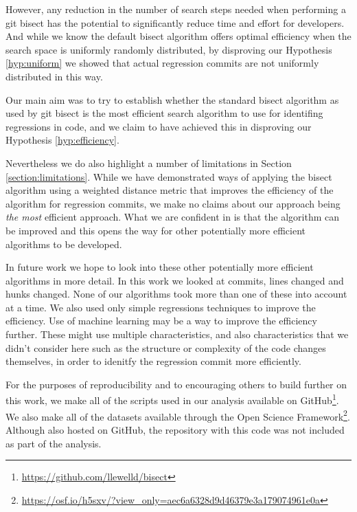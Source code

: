 \documentclass[10pt,journal,compsoc]{IEEEtran}
\begin{document}
However, any reduction in the number of search steps needed when performing a {\code git bisect} has the potential to significantly reduce time and effort for developers. And while we know the default bisect algorithm offers optimal efficiency when the search space is uniformly randomly distributed, by disproving our Hypothesis \ref{hyp:uniform} we showed that actual regression commits are not uniformly distributed in this way.

Our main aim was to try to establish whether the standard bisect algorithm as used by {\code git bisect} is the most efficient search algorithm to use for identifing regressions in code, and we claim to have achieved this in disproving our Hypothesis \ref{hyp:efficiency}.

Nevertheless we do also highlight a number of limitations in Section \ref{section:limitations}. While we have demonstrated ways of applying the bisect algorithm using a weighted distance metric that improves the efficiency of the algorithm for regression commits, we make no claims about our approach being {\it the most\/} efficient approach. What we are confident in is that the algorithm can be improved and this opens the way for other potentially more efficient algorithms to be developed.

In future work we hope to look into these other potentially more efficient algorithms in more detail. In this work we looked at commits, lines changed and hunks changed. None of our algorithms took more than one of these into account at a time. We also used only simple regressions techniques to improve the efficiency. Use of machine learning may be a way to improve the efficiency further. These might use multiple characteristics, and also characteristics that we didn't consider here such as the structure or complexity of the code changes themselves, in order to idenitfy the regression commit more efficiently.

For the purposes of reproducibility and to encouraging others to build further on this work, we make all of the scripts used in our analysis available on GitHub\footnote{\url{https://github.com/llewelld/bisect}}. We also make all of the datasets available through the Open Science Framework\footnote{\url{https://osf.io/h5sxv/?view_only=aec6a6328d9d46379e3a179074961e0a}}. Although also hosted on GitHub, the repository with this code was not included as part of the analysis.
\end{document}
